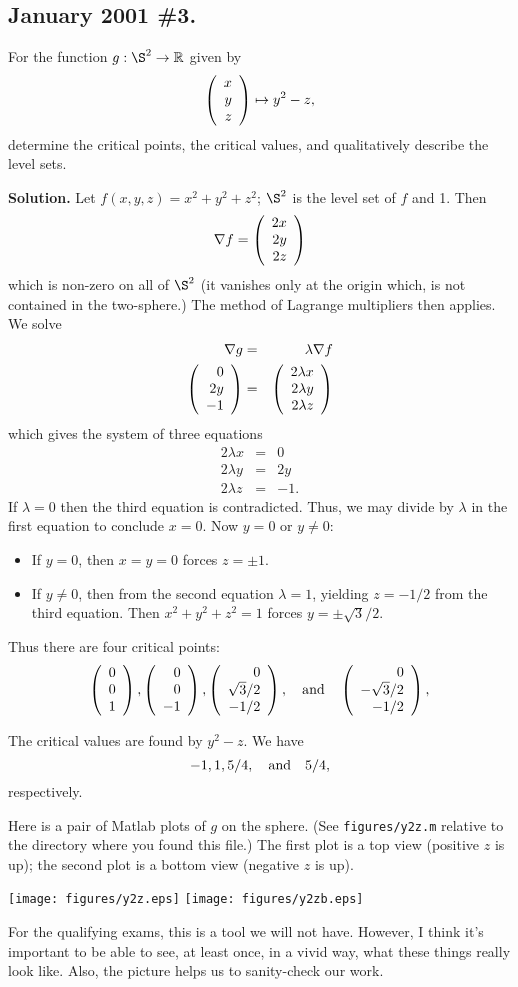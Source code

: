 \documentclass[10pt]{article}
\numberwithin{equation}{subsection}
\begin{document}
\subsection{January 2001 \#3.}

For the function $g:\S^2 \to \R$ given by
$$
	\left(\begin{array}{r} x \\ y \\ z\end{array}\right) \mapsto y^2 - z,
$$
determine the critical points, the critical values, and qualitatively
describe the level sets.

\textbf{Solution.}  Let $f(x,y,z)=x^2+y^2+z^2$; $\S^2$ is the level set
of $f$ and 1.  Then
$$
	\nabla f = \left(\begin{array}{r} 2x \\ 2y \\ 2z\end{array}\right)
$$
which is non-zero on all of $\S^2$ (it vanishes only at the origin which, is
not contained in the two-sphere.) The method of Lagrange multipliers then
applies.  We solve
\begin{eqnarray*}
	\nabla g &=& \lambda \nabla f \\
	\left(\begin{array}{r} 0 \\ 2y \\ -1\end{array}\right)
		&=& \left(\begin{array}{r} 2\lambda x \\ 2\lambda y \\ 2\lambda z\end{array}\right)
\end{eqnarray*}
which gives the system of three equations
\begin{eqnarray*}
	2\lambda x &=& 0 \\
	2\lambda y &=& 2y \\
	2\lambda z &=& -1.
\end{eqnarray*}
If $\lambda=0$ then the third equation is contradicted.  Thus, we may divide by
$\lambda$ in the first equation to conclude $x=0$.  Now $y=0$ or $y\ne 0$:
\begin{itemize}
\item If $y=0$, then $x=y=0$ forces $z=\pm 1$.
\item If $y\ne 0$, then from the second equation $\lambda=1$, yielding
	$z=-1/2$ from the third equation.  Then $x^2+y^2+z^2=1$ forces $y=\pm
	\sqrt{3}/2$.
\end{itemize}
Thus there are four critical points:
$$
	\left(\begin{array}{r} 0 \\ 0 \\ 1\end{array}\right),
	\left(\begin{array}{r} 0 \\ 0 \\ -1\end{array}\right),
	\left(\begin{array}{r} 0 \\ \sqrt{3}/2 \\ -1/2\end{array}\right), \quad\textrm{and}\quad
	\left(\begin{array}{r} 0 \\ -\sqrt{3}/2 \\ -1/2\end{array}\right),
$$

The critical values are found by $y^2-z$.  We have
$$
	-1,
	1,
	5/4, \quad\textrm{and}\quad
	5/4,
$$
respectively.

Here is a pair of Matlab plots of $g$ on the sphere.  (See
\texttt{figures/y2z.m} relative to the directory where you found this file.)
The first plot is a top view (positive $z$ is up); the second plot is a bottom
view (negative $z$ is up).
\begin{center}
\psfragscanon
\texttt{[image: figures/y2z.eps]}
\texttt{[image: figures/y2zb.eps]}
\end{center}
For the qualifying exams, this is a tool we will not have.  However, I think
it's important to be able to see, at least once, in a vivid way, what these
things really look like.  Also, the picture helps us to sanity-check our work.
\end{document}
